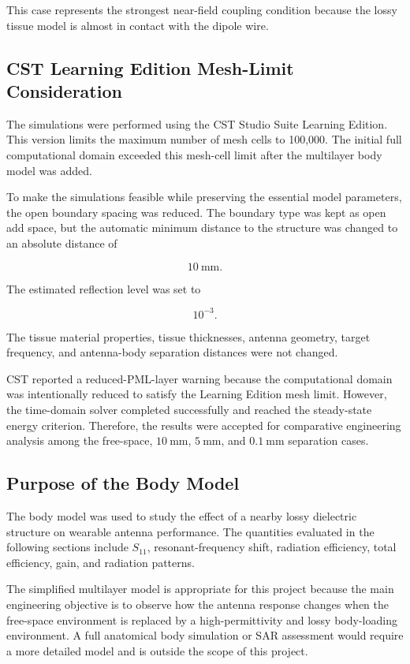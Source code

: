 This case represents the strongest near-field coupling condition because the lossy tissue model is almost in contact with the dipole wire.

\subsection{CST Learning Edition Mesh-Limit Consideration}

The simulations were performed using the CST Studio Suite Learning Edition. This version limits the maximum number of mesh cells to 100,000. The initial full computational domain exceeded this mesh-cell limit after the multilayer body model was added.

To make the simulations feasible while preserving the essential model parameters, the open boundary spacing was reduced. The boundary type was kept as open add space, but the automatic minimum distance to the structure was changed to an absolute distance of

\[
10~\mathrm{mm}.
\]

The estimated reflection level was set to

\[
10^{-3}.
\]

The tissue material properties, tissue thicknesses, antenna geometry, target frequency, and antenna-body separation distances were not changed.

CST reported a reduced-PML-layer warning because the computational domain was intentionally reduced to satisfy the Learning Edition mesh limit. However, the time-domain solver completed successfully and reached the steady-state energy criterion. Therefore, the results were accepted for comparative engineering analysis among the free-space, \(10~\mathrm{mm}\), \(5~\mathrm{mm}\), and \(0.1~\mathrm{mm}\) separation cases.

\subsection{Purpose of the Body Model}

The body model was used to study the effect of a nearby lossy dielectric structure on wearable antenna performance. The quantities evaluated in the following sections include \(S_{11}\), resonant-frequency shift, radiation efficiency, total efficiency, gain, and radiation patterns.

The simplified multilayer model is appropriate for this project because the main engineering objective is to observe how the antenna response changes when the free-space environment is replaced by a high-permittivity and lossy body-loading environment. A full anatomical body simulation or SAR assessment would require a more detailed model and is outside the scope of this project.
